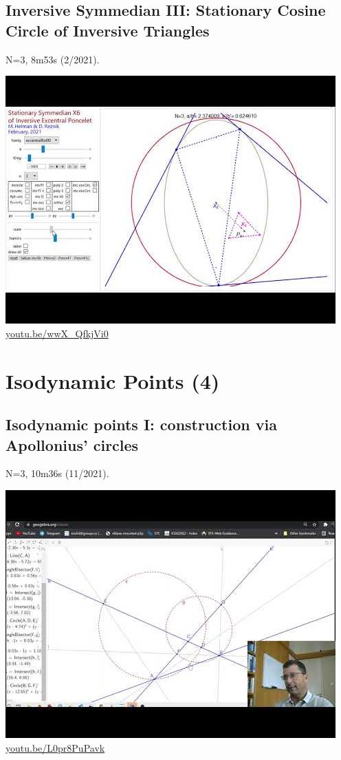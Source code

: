 \documentclass[12pt]{amsart}
\begin{document}
\subsection{Inversive Symmedian III: Stationary Cosine Circle of Inversive Triangles}
\label{vid:wwX_QfkjVi0}
\noindent N=3, 8m53s (2/2021). 
\begin{center}\includegraphics[width=.5\textwidth]{pics/wwX_QfkjVi0.jpg} \\ 
\href{https://youtu.be/wwX_QfkjVi0}{\url{youtu.be/wwX\_QfkjVi0}}\end{center}
% 

\section{Isodynamic Points (4)}

\subsection{Isodynamic points I: construction via Apollonius' circles}
\label{vid:L0pr8PuPavk}
\noindent N=3, 10m36s (11/2021). 
\begin{center}\includegraphics[width=.5\textwidth]{pics/L0pr8PuPavk.jpg} \\ 
\href{https://youtu.be/L0pr8PuPavk}{\url{youtu.be/L0pr8PuPavk}}\end{center}
% 
\end{document}
